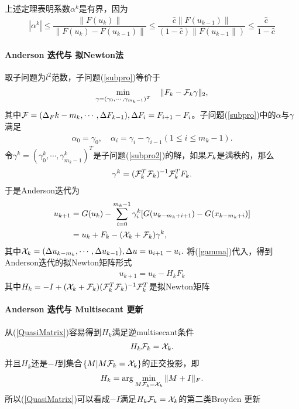 	上述定理表明系数$ \alpha^k $是有界，因为
	\begin{align*}
	|\alpha^k| \leq \dfrac{\|F(u_k)\|}{\|F(u_k) - F(u_{k-1})\|}\leq \dfrac{\hat{c}\|F(u_{k-1})\|}{(1-\hat{c})\|F(u_{k-1}\|)} \leq \dfrac{\hat{c}}{1-\hat{c}}
	\end{align*}
	
	\paragraph{Anderson 迭代与 拟Newton法}
	取子问题为$l^2  $范数，子问题(\ref{subpro})等价于
	\begin{align}
	\min_{\gamma = (\gamma_0,\cdots,\gamma_{m_k - 1})^T} \quad \|F_k - \mathcal{F}_k\gamma\|_2,
	\label{subpro2}
	\end{align}
	其中$ \mathcal{F} = (\Delta_F{k-m_k}, \cdots, \Delta F_{k-1}) ,\Delta F_i = F_{i+1} - F_i $。子问题(\ref{subpro})中的$ \alpha $与$ \gamma $满足
	\begin{align*}
	\alpha_0 = \gamma_0,\quad \alpha_i = \gamma_i - \gamma_{i-1}(1\leq i\leq m_k-1).
	\end{align*}
	令$ \gamma^{k} = (\gamma_0^k,\cdots,\gamma^k_{m_k-1} )^T$是子问题(\ref{subpro2})的解，如果$ \mathcal{F}_k $是满秩的，那么
	\begin{align}
	\gamma^k = (\mathcal{F}_k^T\mathcal{F}_k)^{-1}\mathcal{F}_k^TF_k.
	\label{gamma}
	\end{align}
	于是Anderson迭代为
	\begin{align*}
	u_{k+1}& = G(u_k) - \sum_{i=0}^{m_k-1}\gamma_i^k[G(u_{k-m_k+i+1}) - G(x_{k-m_k + i})]\\
	& = u_k + F_k -(\mathcal{X}_k + \mathcal{F}_k)\gamma^k ,
	\end{align*}
	其中$\mathcal{X}_k= (\Delta u_{k-m_k},\cdots,\Delta u_{k-1})  ,\Delta u = u_{i+1} - u_i.$ 将(\ref{gamma})代入，得到 Anderson迭代的拟Newton矩阵形式
	\begin{align}
	u_{k+1} =  u_k - H_kF_k
	\end{align}
	其中$ H_k = -I +  (\mathcal{X}_k + \mathcal{F}_k)(\mathcal{F}_k^T\mathcal{F}_k)^{-1}\mathcal{F}_k^T$是拟Newton矩阵
\paragraph{Anderson 迭代与 Multisecant 更新}
	从(\ref{QuasiMatrix})容易得到$ H_k $满足逆multisecant条件
	\begin{align*}
	H_k\mathcal{F}_k= \mathcal{X}_k.
	\end{align*}
	并且$ H_k $还是$ -I $到集合$ \{M|M\mathcal{F}_k = \mathcal{X}_k\} $的正交投影，即
	\begin{align*}
	 H_k = \arg\min_{M\mathcal{F}_k = \mathcal{X}_k}  \|M + I\|_F. 
	\end{align*}
	所以(\ref{QuasiMatrix})可以看成$ -I $满足$ H_k\mathcal{F}_k = \mathcal{X}_k $的第二类Broyden 更新
	
